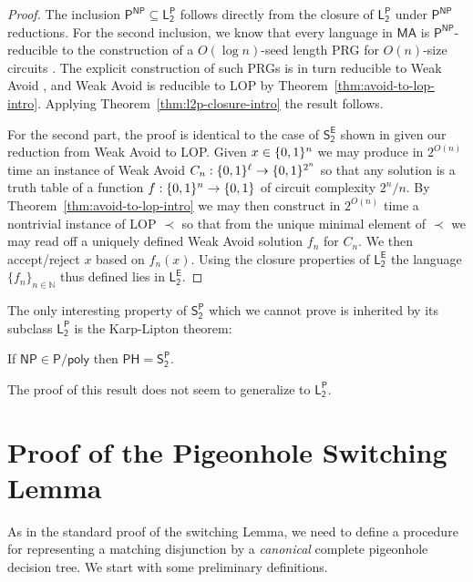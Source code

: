
\begin{proof}
The inclusion $\mathsf{P^{NP}} \subseteq \mathsf{L_2^P}$ follows directly from the closure of $\mathsf{L_2^P}$ under $\mathsf{P^{NP}}$ reductions. For the second inclusion, we know that every language in $\mathsf{MA}$ is $\mathsf{P^{NP}}$-reducible to the construction of a $O(\log n)$-seed length PRG for $O(n)$-size circuits \cite{NW}. The explicit construction of such PRGs is in turn reducible to {\sc Weak Avoid} \cite{Korten}, and {\sc Weak Avoid} is reducible to {\sc LOP} by Theorem~\ref{thm:avoid-to-lop-intro}. Applying Theorem~\ref{thm:l2p-closure-intro} the result follows.

For the second part, the proof is identical to the case of $\mathsf{S_2^E}$ shown in \cite{Li} given our reduction from {\sc Weak Avoid} to {\sc LOP}. Given $x \in \{0,1\}^n$ we may produce in $2^{O(n)}$ time an instance of {\sc Weak Avoid} $C_n:\{0,1\}^{\ell} \to \{0,1\}^{2^n}$ so that any solution is a truth table of a function $f: \{0,1\}^n \to \{0,1\}$ of circuit complexity $2^n/n$. By Theorem~\ref{thm:avoid-to-lop-intro} we may then construct in $2^{O(n)}$ time a nontrivial instance of {\sc LOP} $\prec$ so that from the unique minimal element of $\prec$ we may read off a uniquely defined {\sc Weak Avoid} solution $f_n$ for $C_n$. We then accept/reject $x$ based on $f_n(x)$. Using the closure properties of $\mathsf{L_2^E}$ the language $\{f_n\}_{n \in \mathbb{N}}$ thus defined lies in $\mathsf{L_2^E}$.
\end{proof}

The only interesting property of $\mathsf{S_2^P}$ which we cannot prove is inherited by its subclass $\mathsf{L_2^P}$ is the Karp-Lipton theorem:
\begin{theorem*}\label{thm:s2p-kl}
If $\mathsf{NP} \in \mathsf{P/poly}$ then $\mathsf{PH} = \mathsf{S_2^P}$.    
\end{theorem*}
The proof of this result does not seem to generalize to $\mathsf{L_2^P}$.
\section{Proof of the Pigeonhole Switching Lemma}
\label{sec:php-sl}
As in the standard proof of the switching Lemma, %
we need to define a procedure for representing a matching disjunction by a {\it canonical} complete pigeonhole decision tree. We start with some preliminary definitions.

